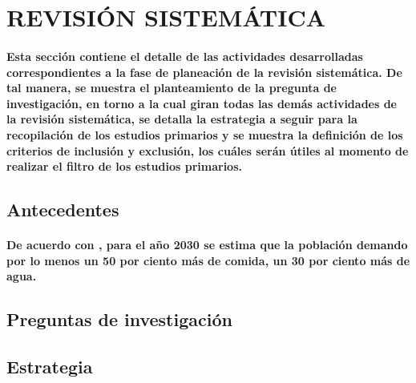 \documentclass[10pt, twocolumn]{article}
\begin{document}
\section{REVISIÓN SISTEMÁTICA}
\paragraph{Esta sección contiene el detalle de las actividades desarrolladas correspondientes a la fase de planeación de la revisión sistemática. De tal manera, se muestra el planteamiento de la pregunta de investigación, en torno a la cual giran todas las demás actividades de la revisión sistemática, se detalla la estrategia a seguir para la recopilación de los estudios primarios y se muestra la definición de los criterios de inclusión y exclusión, los cuáles serán útiles al momento de realizar el filtro de los estudios primarios.}

\subsection{Antecedentes}
\paragraph{De acuerdo con \cite{globalsustainabilityreport}, para el año 2030 se estima que la población demando por lo menos un 50 por ciento más de comida, un 30 por ciento más de agua.}

\subsection{Preguntas de investigación}

\subsection{Estrategia}
\paragraph{}
\end{document}
